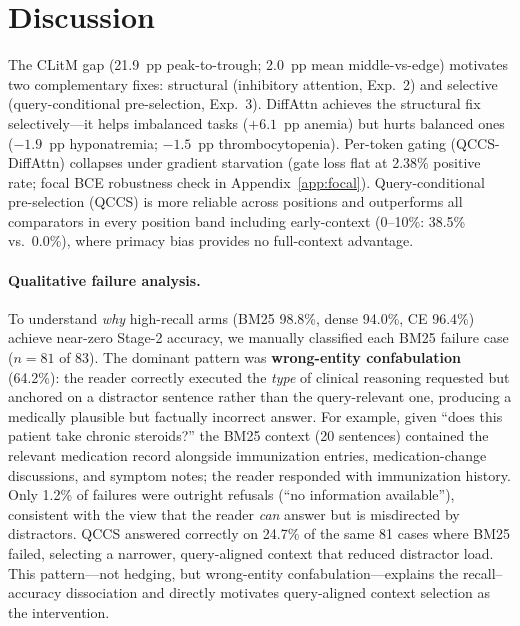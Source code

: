 \documentclass{article}
\begin{document}
\section{Discussion}
\label{sec:discussion}

The CLitM gap (21.9~pp peak-to-trough; 2.0~pp mean middle-vs-edge) motivates two
complementary fixes: structural (inhibitory attention, Exp.~2) and selective
(query-conditional pre-selection, Exp.~3). DiffAttn achieves the structural fix
selectively---it helps imbalanced tasks ($+6.1$~pp anemia) but hurts balanced ones
($-1.9$~pp hyponatremia; $-1.5$~pp thrombocytopenia). Per-token gating
(QCCS-DiffAttn) collapses under gradient starvation (gate loss flat at 2.38\%
positive rate; focal BCE robustness check in Appendix~\ref{app:focal}).
Query-conditional pre-selection (QCCS) is more reliable across positions and
outperforms all comparators in every position band including early-context
(0--10\%: 38.5\% vs.\ 0.0\%), where primacy bias provides no full-context advantage.

\paragraph{Qualitative failure analysis.}
To understand \emph{why} high-recall arms (BM25 98.8\%, dense 94.0\%, CE 96.4\%)
achieve near-zero Stage-2 accuracy, we manually classified each BM25 failure
case ($n{=}81$ of 83). The dominant pattern was \textbf{wrong-entity confabulation}
(64.2\%): the reader correctly executed the \emph{type} of clinical reasoning
requested but anchored on a distractor sentence rather than the query-relevant
one, producing a medically plausible but factually incorrect answer. For example,
given ``does this patient take chronic steroids?'' the BM25 context (20 sentences)
contained the relevant medication record alongside immunization entries, medication-change
discussions, and symptom notes; the reader responded with immunization history. Only
1.2\% of failures were outright refusals (``no information available''), consistent
with the view that the reader \emph{can} answer but is misdirected by distractors.
QCCS answered correctly on 24.7\% of the same 81 cases where BM25 failed,
selecting a narrower, query-aligned context that reduced distractor load.
This pattern---not hedging, but wrong-entity confabulation---explains the
recall–accuracy dissociation and directly motivates query-aligned context
selection as the intervention.
\end{document}
